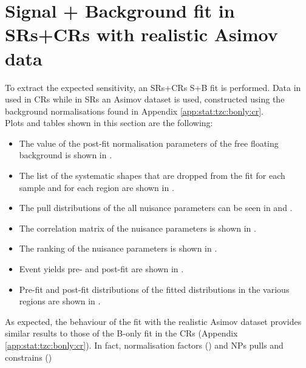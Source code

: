 \section{Signal + Background fit in SRs+CRs with realistic Asimov data}
\label{sec:stat:tzc:splusb:crsr}
To extract the expected sensitivity, an SRs+CRs S+B fit is performed. 
Data in used in CRs while in SRs an Asimov dataset is used,
constructed using the background normalisations found in Appendix \ref{app:stat:tzc:bonly:cr}.\\
Plots and tables shown in this section are the following:
\begin{itemize}
\item The value of the post-fit normalisation parameters of the free floating background is shown in .
\item The list of the systematic shapes that are dropped from the fit for each sample and for each region are shown in .
\item The pull distributions of the all nuisance parameters can be seen in  and . 
\item The correlation matrix of the nuisance parameters is shown in . 
\item The ranking of the nuisance parameters is shown in . 
\item Event yields pre- and post-fit are shown in . 
\item Pre-fit and post-fit distributions of the fitted distributions in the various regions are shown in .
\end{itemize}
As expected, the behaviour of the fit with the realistic Asimov dataset
provides similar results to those of the B-only fit in the CRs
(Appendix \ref{app:stat:tzc:bonly:cr}). 
In fact, normalisation factors () and NPs
pulls and constrains 
() 
